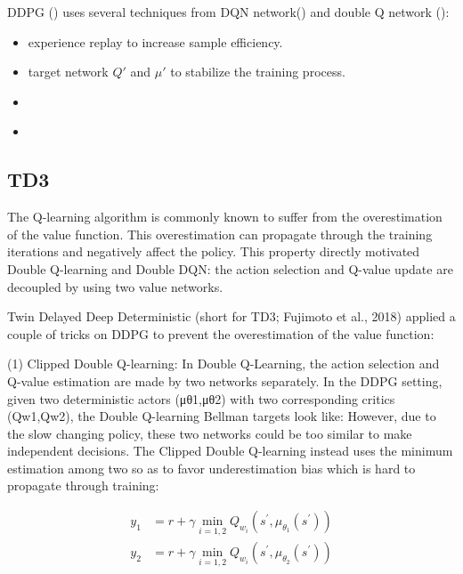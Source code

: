 \begin{refsection}
\begin{remark}[interpretation]DDPG (\cite{lillicrap2015continuous}) uses several techniques from DQN network(\cite{mnih2015human}) and double Q network (\cite{van2016deep}):
	\begin{itemize}
		\item experience replay to increase sample efficiency.
		\item target network $Q'$ and $\mu'$ to stabilize the training process. 
		\item 
	\end{itemize}
	
\end{remark}



\begin{remark}
	\begin{itemize}
		\item 
	\end{itemize}	
\end{remark}


\subsection{TD3}
The Q-learning algorithm is commonly known to suffer from the overestimation of the value function. This overestimation can propagate through the training iterations and negatively affect the policy. This property directly motivated Double Q-learning and Double DQN: the action selection and Q-value update are decoupled by using two value networks.

Twin Delayed Deep Deterministic (short for TD3; Fujimoto et al., 2018) applied a couple of tricks on DDPG to prevent the overestimation of the value function:

(1) Clipped Double Q-learning: In Double Q-Learning, the action selection and Q-value estimation are made by two networks separately. In the DDPG setting, given two deterministic actors (μθ1,μθ2) with two corresponding critics (Qw1,Qw2), the Double Q-learning Bellman targets look like:
However, due to the slow changing policy, these two networks could be too similar to make independent decisions. The Clipped Double Q-learning instead uses the minimum estimation among two so as to favor underestimation bias which is hard to propagate through training:

\begin{align*}
y_{1}&=r+\gamma \min _{i=1,2} Q_{w_{i}}\left(s^{\prime}, \mu_{\theta_{1}}\left(s^{\prime}\right)\right) \\
 y_{2}&=r+\gamma \min _{i=1,2} Q_{w_{i}}\left(s^{\prime}, \mu_{\theta_{2}}\left(s^{\prime}\right)\right)
\end{align*}


\end{refsection}
